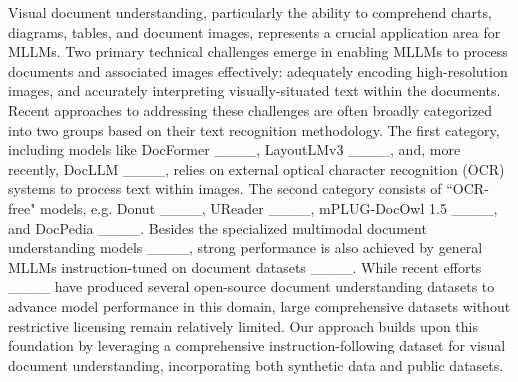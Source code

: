 Visual document understanding, particularly the ability to comprehend charts, diagrams, tables, and document images, represents a crucial application area for MLLMs. 
Two primary technical challenges emerge in enabling MLLMs to process documents and associated images effectively: adequately encoding high-resolution images, and accurately interpreting visually-situated text within the documents. Recent approaches to addressing these challenges are often broadly categorized into two groups based on their text recognition methodology.
The first category, including models like DocFormer ____, LayoutLMv3 ____, and, more recently, DocLLM ____, relies on external optical character recognition (OCR) systems to process text within images. The second category consists of ``OCR-free" models, e.g. Donut ____, UReader ____, mPLUG-DocOwl 1.5 ____, and DocPedia ____.
Besides the specialized multimodal document understanding models ____, strong performance is also achieved by general MLLMs instruction-tuned on document datasets ____. 
While recent efforts ____ have produced several open-source document understanding datasets to advance model performance in this domain, large comprehensive datasets without restrictive licensing remain relatively limited.
Our approach builds upon this foundation by leveraging a comprehensive instruction-following dataset for visual document understanding, incorporating both synthetic data and public datasets.



%